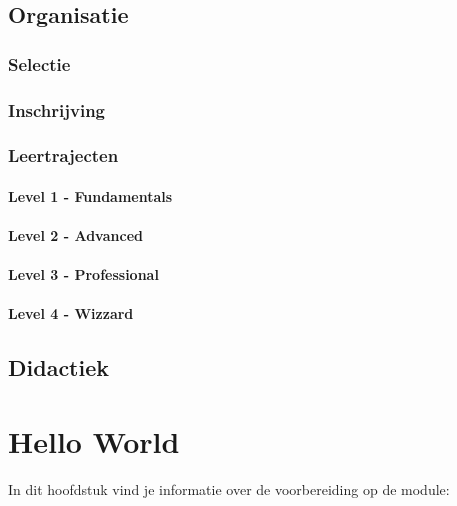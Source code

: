 \documentclass[]{book}
\begin{document}
\section{Organisatie}\label{organisatie}

\subsection{Selectie}\label{selectie}

\subsection{Inschrijving}\label{inschrijving}

\subsection{Leertrajecten}\label{leertrajecten}

\subsubsection{Level 1 - Fundamentals}\label{level-1---fundamentals}

\subsubsection{Level 2 - Advanced}\label{level-2---advanced}

\subsubsection{Level 3 - Professional}\label{level-3---professional}

\subsubsection{Level 4 - Wizzard}\label{level-4---wizzard}

\section{Didactiek}\label{didactiek}

\chapter{Hello World}\label{hello-world}

In dit hoofdstuk vind je informatie over de voorbereiding op de module:
\end{document}
